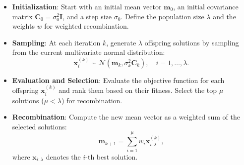 \begin{itemize}
    \item \textbf{Initialization}: Start with an initial mean vector \(\mathbf{m}_0\), an initial covariance matrix \(\mathbf{C}_0 = \sigma_0^2 \mathbf{I}\), and a step size \(\sigma_0\). Define the population size \(\lambda\) and the weights $w$ for weighted recombination.
    
    \item \textbf{Sampling}: At each iteration \(k\), generate \(\lambda\) offspring solutions by sampling from the current multivariate normal distribution:
    \begin{equation*}
    \mathbf{x}_i^{(k)} \sim \mathcal{N}(\mathbf{m}_k, \sigma_k^2 \mathbf{C}_k), \quad i = 1, \dots, \lambda.
    \end{equation*}
    
    \item \textbf{Evaluation and Selection}: Evaluate the objective function for each offspring \(\mathbf{x}_i^{(k)}\) and rank them based on their fitness. Select the top \(\mu\) solutions (\(\mu < \lambda\)) for recombination.
    
    \item \textbf{Recombination}: Compute the new mean vector as a weighted sum of the selected solutions:
    \begin{equation*}
    \mathbf{m}_{k+1} = \sum_{i=1}^\mu w_i \mathbf{x}_{i:\lambda}^{(k)},
    \end{equation*}
    where \(\mathbf{x}_{i:\lambda}\) denotes the \(i\)-th best solution.
    

\end{itemize}

